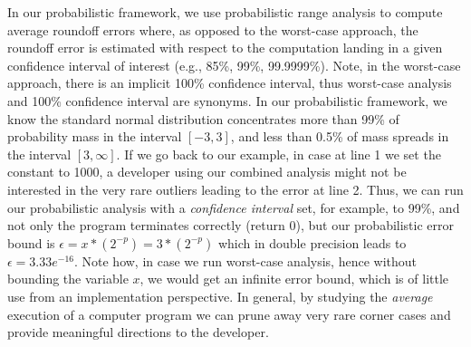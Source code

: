 In our probabilistic framework, we use probabilistic range analysis to compute average roundoff errors where, as opposed to the worst-case approach, the roundoff error is estimated with respect to the computation landing in a given confidence interval of interest (e.g., 85\%, 99\%, 99.9999\%).
%
Note, in the worst-case approach, there is an implicit 100\% confidence interval, thus worst-case analysis and 100\% confidence interval are synonyms.
%
In our probabilistic framework, we know the standard normal distribution concentrates more than 99\% of probability mass in the interval $[-3, 3]$, and less than 0.5\% of mass spreads in the interval $[3, \infty]$.
%
If we go back to our example, in case at line 1 we set the constant to 1000, a developer using our combined analysis might not be interested in the very rare outliers leading to the error at line 2.
%
Thus, we can run our probabilistic analysis with a \emph{confidence interval} set, for example, to 99\%, and not only the program terminates correctly (return 0), but our probabilistic error bound is $\epsilon = x*(2^{-p}) = 3*(2^{-p})$ which in double precision leads to $\epsilon = 3.33e^{-16}$.
%
Note how, in case we run worst-case analysis, hence without bounding the variable $x$, we would get an infinite error bound, which is of little use from an implementation perspective. 
%
In general, by studying the \emph{average} execution of a computer program we can prune away very rare corner cases and provide meaningful directions to the developer.
%
\newpage



%
%
%

%
%
